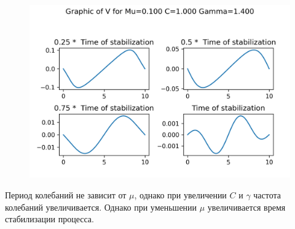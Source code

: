 \begin{figure}[H]
	\includegraphics[scale=0.5]{../graphs_data_nonsmooth_1/slices/Graph_V_mu0.100_C1.000_gamma1.400.png}
\end{figure}

Период колебаний не зависит от $\mu$, однако при увеличении $C$ и $\gamma$ частота колебаний увеличивается. Однако при уменьшении $\mu$ увеличивается время стабилизации процесса.


